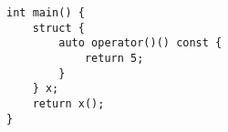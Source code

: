 \begin{lstlisting}[title=\href{https://godbolt.org/z/foj6Kq}{\texttt{godbolt.org/z/foj6Kq}}]
int main() {
    struct {
        auto operator()() const {
            return 5;
        }
    } x;
    return x();
}
\end{lstlisting}
